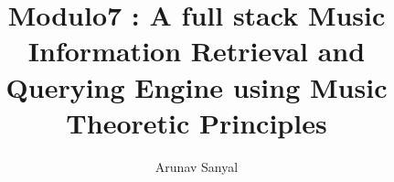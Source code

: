 \documentclass[12pt,oneside,final]{thesis}
\begin{document}
\title{Modulo7 : A full stack Music Information Retrieval and Querying Engine using Music Theoretic Principles}
\author{Arunav Sanyal}
\thesis
\masterscience
\copyrightnotice














\end{document}
